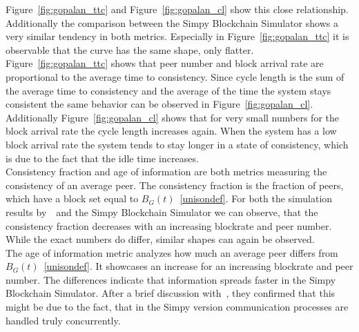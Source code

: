 Figure~\ref{fig:gopalan_ttc} and Figure~\ref{fig:gopalan_cl} show this close relationship. Additionally the comparison between the Simpy Blockchain Simulator shows a very similar tendency in both metrics. Especially in Figure~\ref{fig:gopalan_ttc} it is observable that the curve has the same shape, only flatter. Figure~\ref{fig:gopalan_ttc} shows that peer number and block arrival rate are proportional to the average time to consistency. Since cycle length is the sum of the average time to consistency and the average of the time the system stays consistent the same behavior can be observed in Figure~\ref{fig:gopalan_cl}. Additionally Figure~\ref{fig:gopalan_cl} shows that for very small numbers for the block arrival rate the cycle length increases again. When the system has a low block arrival rate the system tends to stay longer in a state of consistency, which is due to the fact that the idle time increases.\\
Consistency fraction and age of information are both metrics measuring the consistency of an average peer. The consistency fraction is the fraction of peers, which have a block set equal to $B_G(t)$~\ref{unisondef}. For both the simulation results by~~and the Simpy Blockchain Simulator we can observe, that the consistency fraction decreases with an increasing blockrate and peer number. While the exact numbers do differ, similar shapes can again be observed.\\
The age of information metric analyzes how much an average peer differs from $B_G(t)$~\ref{unisondef}. It showcases an increase for an increasing blockrate and peer number.
The differences indicate that information spreads faster in the Simpy Blockchain Simulator. After a brief discussion with~, they confirmed that this might be due to the fact, that in the Simpy version communication processes are handled truly concurrently.	

